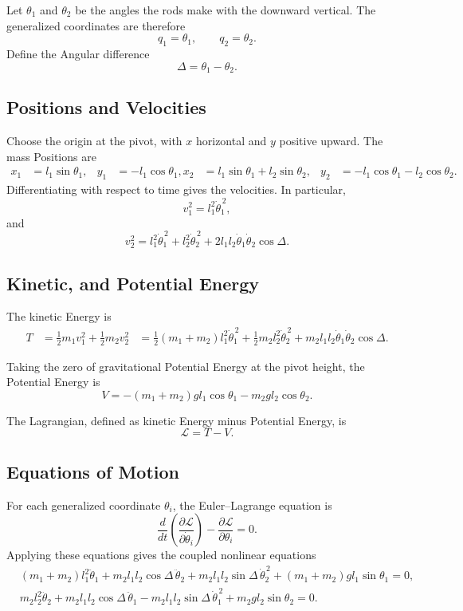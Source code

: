 \documentclass[a4paper, 10pt, onepage]{elegantbook}
\begin{document}
{Let \(\theta_1\) and \(\theta_2\) be the angles the rods make with the
downward vertical. The generalized coordinates are therefore
\[
q_1=\theta_1,\qquad q_2=\theta_2.
\]
Define the Angular difference
\[
\Delta=\theta_1-\theta_2.
\]

\subsection{Positions and Velocities}

Choose the origin at the pivot, with \(x\) horizontal and \(y\) positive
upward. The mass Positions are
\[
\begin{aligned}
x_1 &= l_1\sin\theta_1,
& y_1 &= -l_1\cos\theta_1,
x_2 &= l_1\sin\theta_1+l_2\sin\theta_2,
& y_2 &= -l_1\cos\theta_1-l_2\cos\theta_2.
\end{aligned}
\]
Differentiating with respect to time gives the velocities. In
particular,
\[
v_1^2=l_1^2\dot{\theta}_1^{\,2},
\]
and
\[
v_2^2
=l_1^2\dot{\theta}_1^{\,2}
+l_2^2\dot{\theta}_2^{\,2}
+2l_1l_2\dot{\theta}_1\dot{\theta}_2\cos\Delta.
\]

\subsection{Kinetic, and Potential Energy}

The kinetic Energy is
\[
\begin{aligned}
T
&=\frac12m_1v_1^2+\frac12m_2v_2^2
&=\frac12(m_1+m_2)l_1^2\dot{\theta}_1^{\,2}
+\frac12m_2l_2^2\dot{\theta}_2^{\,2}
+m_2l_1l_2\dot{\theta}_1\dot{\theta}_2\cos\Delta.
\end{aligned}
\]

Taking the zero of gravitational Potential Energy at the pivot height,
the Potential Energy is
\[
V=-(m_1+m_2)gl_1\cos\theta_1-m_2gl_2\cos\theta_2.
\]

The Lagrangian, defined as kinetic Energy minus Potential Energy, is
\[
\mathcal{L}=T-V.
\]

\subsection{Equations of Motion}

For each generalized coordinate \(\theta_i\), the Euler--Lagrange
equation is
\[
\frac{d}{dt}\left(\frac{\partial\mathcal{L}}
{\partial\dot{\theta}_i}\right)
-\frac{\partial\mathcal{L}}{\partial\theta_i}=0.
\]
Applying these equations gives the coupled nonlinear equations
\[
\begin{aligned}
&(m_1+m_2)l_1^2\ddot{\theta}_1
+m_2l_1l_2\cos\Delta\,\ddot{\theta}_2
+m_2l_1l_2\sin\Delta\,\dot{\theta}_2^{\,2}
+(m_1+m_2)gl_1\sin\theta_1=0,\\[4pt]
&m_2l_2^2\ddot{\theta}_2
+m_2l_1l_2\cos\Delta\,\ddot{\theta}_1
-m_2l_1l_2\sin\Delta\,\dot{\theta}_1^{\,2}
+m_2gl_2\sin\theta_2=0.
\end{aligned}
\]

}
\end{document}
